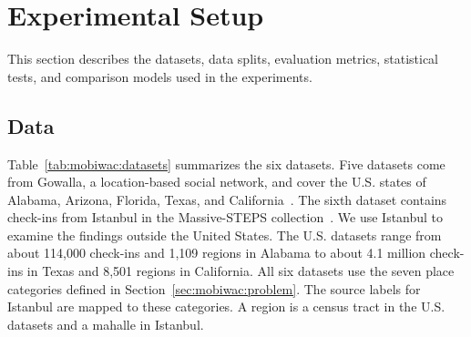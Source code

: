 \section{Experimental Setup}
\label{sec:mobiwac:setup}

This section describes the datasets, data splits, evaluation metrics, statistical tests, and comparison models used in the experiments.

\subsection{Data}
\label{sec:mobiwac:setup-data}
Table~\ref{tab:mobiwac:datasets} summarizes the six datasets. Five datasets come from Gowalla, a location-based social network, and cover the U.S. states of Alabama, Arizona, Florida, Texas, and California~\cite{cho2011gowalla}. The sixth dataset contains check-ins from Istanbul in the Massive-STEPS collection~\cite{wongso2025massivesteps}. We use Istanbul to examine the findings outside the United States.
The U.S. datasets range from about 114,000 check-ins and 1,109 regions in Alabama to about 4.1 million check-ins in Texas and 8,501 regions in California. All six datasets use the seven place categories defined in Section~\ref{sec:mobiwac:problem}. The source labels for Istanbul are mapped to these categories. A region is a census tract in the U.S. datasets and a mahalle in Istanbul.


